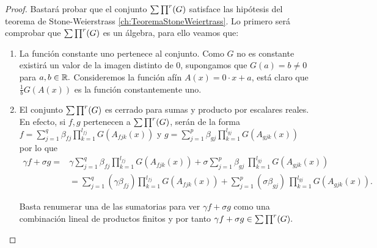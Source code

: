 \begin{proof}
    Bastará probar que el conjunto $\sum \prod^r (G)$ satisface las hipótesis del teorema de
     Stone-Weierstrass \ref{ch:TeoremaStoneWeiertrass}.
    Lo primero será comprobar que $\sum \prod^r (G)$ es un álgebra, para ello veamos que:         
    \begin{enumerate}
        \item La función constante uno pertenece al conjunto. 
        Como $G$ no es constante existirá un valor de la imagen distinto de $0$, supongamos que $G(a)= b \neq 0$ para $a,b \in \mathbb{R}.$
        Consideremos la función afín $A(x) = 0 \cdot x + a$, está claro que $\frac{1}{b}G(A(x))$ es la función constantemente uno. 
        \item El conjunto $\sum \prod^r (G)$ es cerrado para sumas y producto por escalares reales. 
        En efecto, si $f,g$ pertenecen a  $\sum \prod^r (G)$, serán de la forma
         $f = \sum_{j = 1} ^q  \beta_{fj} \prod_{k=1}^{l_{fj}}  G(A_{fjk}(x))$ y 
        $g = \sum_{j = 1} ^p  \beta_{gj} \prod_{k=1}^{l_{gj}}G(A_{gjk}(x))$  por lo que
        \begin{equation}
            \begin{split}
                \gamma f+ \sigma g =& \gamma \sum_{j = 1} ^q  \beta_{fj} \prod_{k=1}^{l_{fj}}  G(A_{fjk}(x)) + 
                \sigma \sum_{j = 1} ^p  \beta_{gj} \ \prod_{k=1}^{l_{gj}}G(A_{gjk}(x)) \\
                & = \sum_{j = 1} ^q  (\gamma \beta_{fj})  \prod_{k=1}^{l_{fj}}  G(A_{fjk}(x)) + 
                \sum_{j = 1} ^p  (\sigma \beta_{gj}) \ \prod_{k=1}^{l_{gj}}G(A_{gjk}(x)).
            \end{split}
        \end{equation}
        
        Basta renumerar una de las sumatorias para ver $\gamma f+ \sigma g$ como una combinación 
        lineal de productos finitos y por tanto $\gamma f+ \sigma g \in \sum \prod^r (G).$
        

\end{enumerate}
\end{proof}

